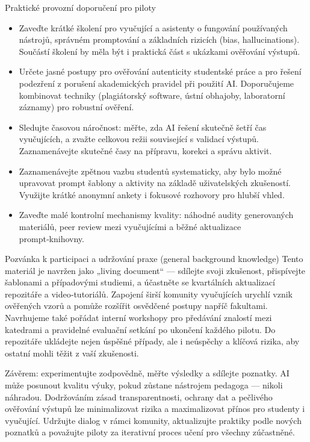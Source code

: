 \documentclass{report}%
\begin{document}
Praktické provozní doporučení pro piloty
\begin{itemize}
\item Zaveďte krátké školení pro vyučující a asistenty o fungování používaných nástrojů, správném promptování a základních rizicích (bias, hallucinations). Součástí školení by měla být i praktická část s ukázkami ověřování výstupů.
\item Určete jasné postupy pro ověřování autenticity studentské práce a pro řešení podezření z porušení akademických pravidel při použití AI. Doporučujeme kombinovat techniky (plagiátorský software, ústní obhajoby, laboratorní záznamy) pro robustní ověření.
\item Sledujte časovou náročnost: měřte, zda AI řešení skutečně šetří čas vyučujících, a zvažte celkovou režii související s validací výstupů. Zaznamenávejte skutečné časy na přípravu, korekci a správu aktivit.
\item Zaznamenávejte zpětnou vazbu studentů systematicky, aby bylo možné upravovat prompt šablony a aktivity na základě uživatelských zkušeností. Využijte krátké anonymní ankety i fokusové rozhovory pro hlubší vhled.
\item Zaveďte malé kontrolní mechanismy kvality: náhodné audity generovaných materiálů, peer review mezi vyučujícími a běžné aktualizace prompt‑knihovny.
\end{itemize}

Pozvánka k participaci a udržování praxe
(general background knowledge) Tento materiál je navržen jako „living document“ — sdílejte svoji zkušenost, přispívejte šablonami a případovými studiemi, a účastněte se kvartálních aktualizací repozitáře a video‑tutoriálů. Zapojení širší komunity vyučujících urychlí vznik ověřených vzorů a pomůže rozšířit osvědčené postupy napříč fakultami. Navrhujeme také pořádat interní workshopy pro předávání znalostí mezi katedrami a pravidelné evaluační setkání po ukončení každého pilotu. Do repozitáře ukládejte nejen úspěšné případy, ale i neúspěchy a klíčová rizika, aby ostatní mohli těžit z vaší zkušenosti.

Závěrem: experimentujte zodpovědně, měřte výsledky a sdílejte poznatky. AI může posunout kvalitu výuky, pokud zůstane nástrojem pedagoga — nikoli náhradou. Dodržováním zásad transparentnosti, ochrany dat a pečlivého ověřování výstupů lze minimalizovat rizika a maximalizovat přínos pro studenty i vyučující. Udržujte dialog v rámci komunity, aktualizujte praktiky podle nových poznatků a považujte piloty za iterativní proces učení pro všechny zúčastněné.%

%
%
%
\end{document}
